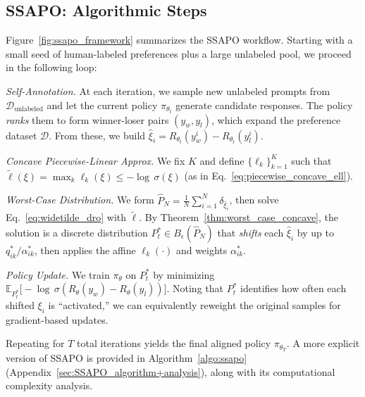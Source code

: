 \subsection{SSAPO: Algorithmic Steps}
\label{subsec:ssapo_algorithm}
Figure~\ref{fig:ssapo_framework} summarizes the SSAPO workflow. 
Starting with a small seed of human-labeled preferences plus a large unlabeled pool, 
we proceed in the following loop:

\begin{compactenum}
\item \emph{Self-Annotation.}  
  At each iteration, we sample new unlabeled prompts from 
  \(\mathcal{D}_{\mathrm{unlabeled}}\) and let the current policy 
  \(\pi_{\theta_t}\) generate candidate responses.  The policy \emph{ranks} them 
  to form winner-loser pairs $(y_w,y_l)$, which expand the preference dataset 
  \(\mathcal{D}\).  From these, we build \(\hat{\xi}_i = R_{\theta_t}(y_w^i) - R_{\theta_t}(y_l^i)\).

\item \emph{Concave Piecewise-Linear Approx.}  
  We fix $K$ and define $\{\ell_k\}_{k=1}^K$ such that 
  $\widetilde{\ell}(\xi) = \max_k \ell_k(\xi)\le -\!\log\,\sigma(\xi)$ 
  (as in Eq.~\eqref{eq:piecewise_concave_ell}).  

\item \emph{Worst-Case Distribution.}  
  We form $\hat{P}_N=\tfrac1N\sum_{i=1}^N \delta_{\hat{\xi}_i}$, 
  then solve Eq.~\eqref{eq:widetilde_dro} with $\widetilde{\ell}$.  
  By Theorem~\ref{thm:worst_case_concave}, the solution is a discrete distribution 
  $P^*_t \in B_\epsilon(\hat{P}_N)$ that \emph{shifts} each $\hat{\xi}_i$ 
  by up to $q_{ik}^{*}/\alpha_{ik}^{*}$, then applies the affine $\ell_k(\cdot)$ 
  and weights $\alpha_{ik}^{*}$.  

\item \emph{Policy Update.}  
  We train $\pi_{\theta}$ on $P^*_t$ by minimizing 
  $\mathbb{E}_{P^*_t}\bigl[-\!\log\,\sigma(R_\theta(y_w)-R_\theta(y_l))\bigr]$.  
  Noting that $P^*_t$ identifies how often each shifted $\xi_i$ is “activated,” 
  we can equivalently reweight the original samples for gradient-based updates.
\end{compactenum}

Repeating for $T$ total iterations yields the final aligned policy $\pi_{\theta_T}$. A more explicit version of SSAPO is provided in Algorithm~\ref{algo:ssapo} (Appendix~\ref{sec:SSAPO_algorithm+analysis}), along with its computational complexity analysis.

